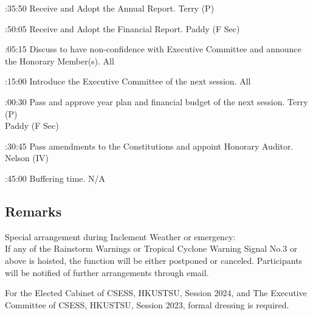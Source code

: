 \bTR{}:35:50
\eTD\bTD Receive and Adopt the Annual Report.
\eTD\bTD Terry (P)
\eTD\eTR

\bTR{}:50:05
\eTD\bTD Receive and Adopt the Financial Report.
\eTD\bTD Paddy (F Sec)
\eTD\eTR

\bTR{}:05:15
\eTD\bTD Discuss to have non-confidence with Executive Committee and announce the Honorary Member(s).
\eTD\bTD All
\eTD\eTR

\bTR{}:15:00
\eTD\bTD Introduce the Executive Committee of the next session.
\eTD\bTD All
\eTD\eTR

\bTR{}:00:30
\eTD\bTD Pass and approve year plan and financial budget of the next session.
\eTD\bTD Terry (P) \\ Paddy (F Sec)
\eTD\eTR

\bTR{}:30:45
\eTD\bTD Pass amendments to the Constitutions and appoint Honorary Auditor.
\eTD\bTD Nelson (IV)
\eTD\eTR

\bTR{}:45:00
\eTD\bTD Buffering time.
\eTD\bTD N/A
\eTD\eTR

\eTABLEbody
\eTABLE

\subsection{Remarks}
\startitemize
\item Special arrangement during Inclement Weather or emergency: \\
If any of the Rainstorm Warnings or Tropical Cyclone Warning Signal No.3 or above is hoisted, the function will be either postponed or canceled. Participants will be notified of further arrangements through email.
\item For the Elected Cabinet of CSESS, HKUSTSU, Session 2024, and The Executive Committee of CSESS, HKUSTSU, Session 2023, formal dressing is required.
\stopitemize

\stopsection
\pagebreak
